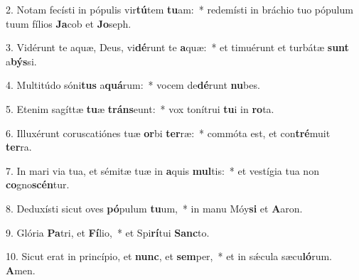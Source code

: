2. Notam fecísti in pópulis vir\textbf{tú}tem \textbf{tu}am:~*  redemísti in bráchio tuo pópulum tuum fílios \textbf{Ja}cob et \textbf{Jo}seph.\

3. Vidérunt te aquæ, Deus, vi\textbf{dé}runt te \textbf{a}quæ:~*  et timuérunt et turbátæ \textbf{sunt} a\textbf{býs}si.\

4. Multitúdo sóni\textbf{tus} a\textbf{quá}rum:~*  vocem de\textbf{dé}runt \textbf{nu}bes.\

5. Etenim sagíttæ \textbf{tu}æ \textbf{tráns}eunt:~*  vox tonítrui \textbf{tu}i in \textbf{ro}ta.\

6. Illuxérunt coruscatiónes tuæ \textbf{or}bi \textbf{ter}ræ:~*  commóta est, et con\textbf{tré}muit \textbf{ter}ra.\

7. In mari via tua, et sémitæ tuæ in \textbf{a}quis \textbf{mul}tis:~*  et vestígia tua non \textbf{co}gno\textbf{scén}tur.\

8. Deduxísti sicut oves \textbf{pó}pulum \textbf{tu}um,~*  in manu Móy\textbf{si} et \textbf{A}aron.\

9. Glória \textbf{Pa}tri, et \textbf{Fí}lio,~*  et Spi\textbf{rí}tui \textbf{Sanc}to.\

10. Sicut erat in princípio, et \textbf{nunc}, et \textbf{sem}per,~*  et in sǽcula sæcu\textbf{ló}rum. \textbf{A}men.\

